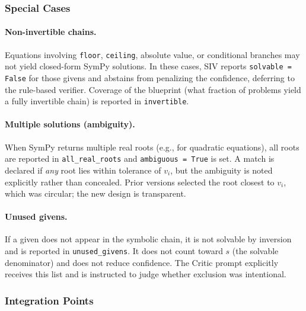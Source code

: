 \documentclass[11pt,a4paper]{article}
\begin{document}
\subsubsection{Special Cases}

\paragraph{Non-invertible chains.}
Equations involving \texttt{floor}, \texttt{ceiling}, absolute value, or conditional branches may not yield closed-form SymPy solutions.
In these cases, SIV reports \texttt{solvable = False} for those givens and abstains from penalizing the confidence, deferring to the rule-based verifier.
Coverage of the blueprint (what fraction of problems yield a fully invertible chain) is reported in \texttt{invertible}.

\paragraph{Multiple solutions (ambiguity).}
When SymPy returns multiple real roots (e.g., for quadratic equations), all roots are reported in \texttt{all\_real\_roots} and \texttt{ambiguous = True} is set.
A match is declared if \emph{any} root lies within tolerance of $v_i$, but the ambiguity is noted explicitly rather than concealed.
Prior versions selected the root closest to $v_i$, which was circular; the new design is transparent.

\paragraph{Unused givens.}
If a given does not appear in the symbolic chain, it is not solvable by inversion and is reported in \texttt{unused\_givens}.
It does not count toward $s$ (the solvable denominator) and does not reduce confidence.
The Critic prompt explicitly receives this list and is instructed to judge whether exclusion was intentional.

\subsubsection{Integration Points}
\end{document}
